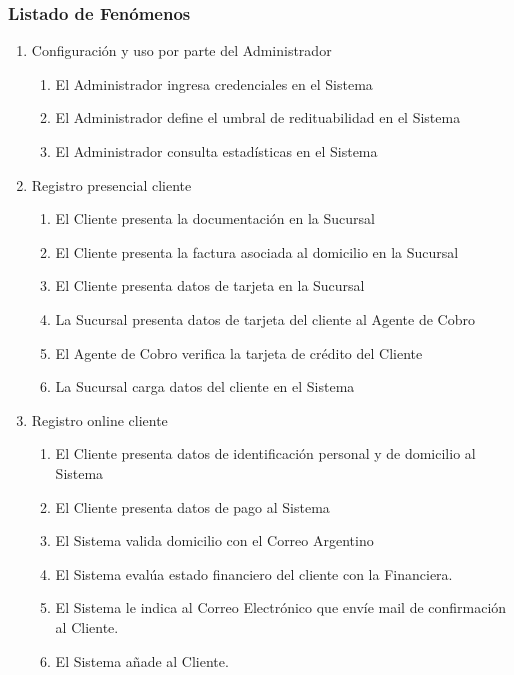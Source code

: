\subsubsection{Listado de Fenómenos}
\begin{enumerate}
 \item Configuración y uso por parte del Administrador
  \begin{enumerate}
   \item El Administrador ingresa credenciales en el Sistema
   \item El Administrador define el umbral de redituabilidad en el Sistema
   \item El Administrador consulta estadísticas en el Sistema
  \end{enumerate}

 \item Registro presencial cliente
  \begin{enumerate}
    \item El Cliente presenta la documentación en la Sucursal
    \item El Cliente presenta la factura asociada al domicilio en la Sucursal
    \item El Cliente presenta datos de tarjeta en la Sucursal
    \item La Sucursal presenta datos de tarjeta del cliente al Agente de Cobro
    \item El Agente de Cobro verifica la tarjeta de crédito del Cliente %
    \item La Sucursal carga datos del cliente en el Sistema
  \end{enumerate}
  
 \item Registro online cliente
  \begin{enumerate}
    \item El Cliente presenta datos de identificación personal y de domicilio al Sistema
    \item El Cliente presenta datos de pago al Sistema
    \item El Sistema valida domicilio con el Correo Argentino
    \item El Sistema eval\'ua estado financiero del cliente con la Financiera.
    \item El Sistema le indica al Correo Electr\'onico que env\'ie mail de confirmaci\'on al Cliente. 
    \item El Sistema añade al Cliente.
  \end{enumerate}
  

\end{enumerate}

